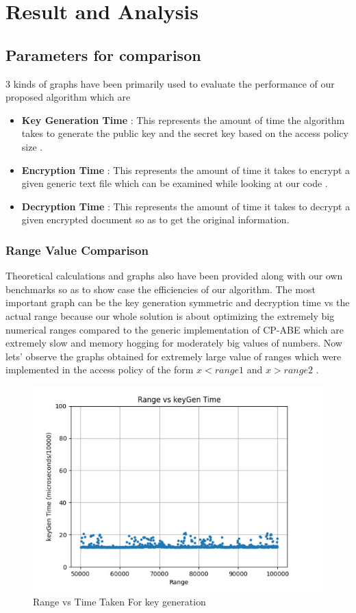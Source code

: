 \chapter{Result and Analysis}

\section{Parameters for comparison}
3 kinds of graphs have been primarily used to evaluate the performance of our proposed  algorithm which are 

\begin{itemize}
    \item \textbf{Key Generation Time} : This represents the amount of time the algorithm takes to generate the public key and the secret key based on the access policy size .
 \item \textbf{Encryption Time} : This represents the amount of time it takes to encrypt a given generic text file which can be examined while looking at our code .
  \item \textbf{Decryption Time} : This represents the amount of time it takes to decrypt a given encrypted document so as to get the original information.
\end{itemize}

\subsection{Range Value Comparison}
Theoretical calculations and graphs also have been provided along with our own benchmarks so as to show case the efficiencies of our algorithm. The most important graph can be the key generation symmetric and decryption time vs the actual range because our whole solution is about optimizing the extremely big numerical ranges compared to the generic implementation of CP-ABE which are extremely slow and memory hogging for moderately big values of numbers. Now lets’ observe the graphs obtained for extremely large value of ranges which were implemented in the access policy of the form  \(x < range1 \)  and   \(x > range2\) .

\begin{figure}[h]
    \centering
    \includegraphics[width=0.75\linewidth]{Images/RangeVsKeyGen.jpeg}
    \caption{Range vs Time Taken For key generation}
    \label{fig:enter-label}
\end{figure}


